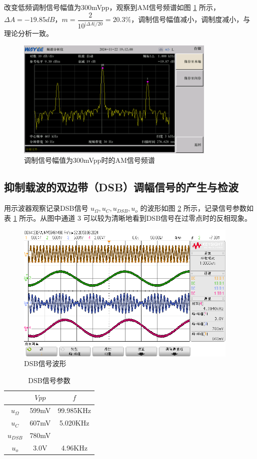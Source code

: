 \documentclass[UTF8]{ctexart}
\begin{document}
改变低频调制信号幅值为300mVpp，观察到AM信号频谱如图 \ref{fig:16} 所示，$\Delta A=-19.85dB$，$m=\dfrac{2}{10^{\left\lvert \Delta A\right\rvert/20 }}=20.3\%$，调制信号幅值减小，调制度减小，与理论分析一致。
\begin{figure}[H]
    \centering
    \includegraphics[width=0.85\textwidth]{pics/16.png}
    \caption{调制信号幅值为300mVpp时的AM信号频谱}\label{fig:16}
\end{figure}
\subsection{抑制载波的双边带（DSB）调幅信号的产生与检波}
用示波器观察记录DSB信号 $u_\Omega,u_C,u_{DSB},u_o$ 的波形如图 \ref{fig:21} 所示，记录信号参数如表 \ref{tab:3} 所示。从图中通道 3 可以较为清晰地看到DSB信号在过零点时的反相现象。
\begin{figure}[H]
    \centering
    \includegraphics[width=0.95\textwidth]{pics/21.png}
    \caption{DSB信号波形}\label{fig:21}
\end{figure}
\begin{table}[H]
    \centering
    \vspace{-2em}
    \caption{DSB信号参数}
    \label{tab:3}
    \begin{tabular}{c|c|c}
    \hline
               & $Vpp$ & $f$       \\ \hline
    $u_\Omega$ & 599mV & 99.985KHz \\ \hline
    $u_C$      & 607mV & 5.020KHz  \\ \hline
    $u_{DSB}$  & 780mV &           \\ \hline
    $u_o$      & 3.0V  & 4.96KHz   \\ \hline
    \end{tabular}
\end{table}
\end{document}
